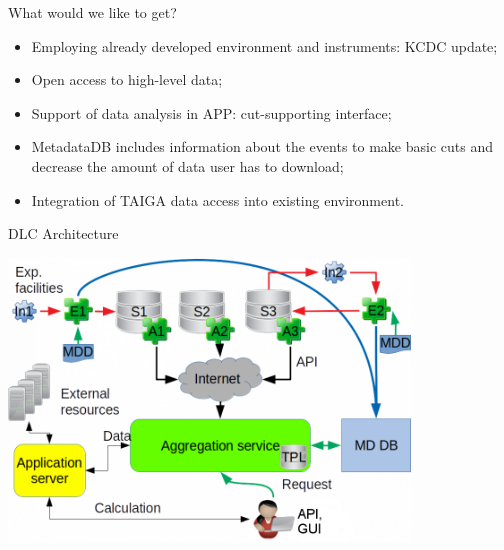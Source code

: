 \begin{frame}{What would we like to get?}
\begin{itemize}
 \item  Employing already developed environment and instruments: KCDC update;
 \item  Open access to high-level data;
 \item  Support of data analysis in APP: cut-supporting interface;
 \item  MetadataDB includes information about the events to make basic cuts and decrease the amount of data user has to download;
 \item  Integration of TAIGA data access into existing environment.
\end{itemize}
\end{frame}
% 
\begin{frame}{DLC Architecture}
\begin{center}
  \includegraphics[width=0.8\textwidth]{pics/arch_appds.png}
\end{center}
\end{frame}
